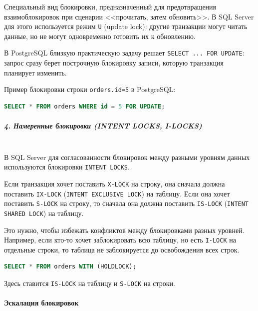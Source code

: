  Специальный вид блокировки, предназначенный для предотвращения взаимоблокировок при сценарии <<прочитать, затем обновить>>. В SQL Server для этого используется режим \texttt{U} (update lock): другие транзакции могут читать данные, но не могут одновременно готовить их к обновлению.
 
 В PostgreSQL близкую практическую задачу решает \texttt{SELECT ... FOR UPDATE}: запрос сразу берет построчную блокировку записи, которую транзакция планирует изменить.
 
 Пример блокировки строки \texttt{orders.id=5} в PostgreSQL:
 \begin{lstlisting}[language=SQL]
     SELECT * FROM orders WHERE id = 5 FOR UPDATE;
 \end{lstlisting}
 
 \subparagraph{4. Намеренные блокировки (INTENT LOCKS, I-LOCKS)} ~\\

 В SQL Server для согласованности блокировок между разными уровням данных используются блокировки \texttt{INTENT LOCKS}. \autocite{MicrosoftLearnSQLserverTransLock}
 
Если транзакция хочет поставить \texttt{X-LOCK} на строку, она сначала должна поставить \texttt{IX-LOCK} (\texttt{INTENT EXCLUSIVE LOCK}) на таблицу. Если она хочет поставить \texttt{S-LOCK} на строку, то сначала она должна поставить \texttt{IS-LOCK} (\texttt{INTENT SHARED LOCK}) на таблицу.
 
 Это нужно, чтобы избежать конфликтов между блокировками разных уровней. Например, если кто-то хочет заблокировать всю таблицу, но есть \texttt{I-LOCK} на отдельные строки, то таблица не заблокируется до освобождения всех строк.
 
 \begin{lstlisting}[language=SQL]
     SELECT * FROM orders WITH (HOLDLOCK);
 \end{lstlisting}
 
 Здесь ставится \texttt{IS-LOCK} на таблицу и \texttt{S-LOCK} на строки.

\paragraph{Эскалация блокировок} ~\\

